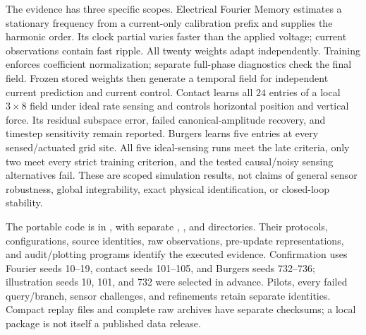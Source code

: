 \documentclass[journal]{IEEEtran}
\begin{document}
The evidence has three specific scopes. Electrical Fourier Memory estimates a
stationary frequency from a current-only calibration prefix and supplies the
harmonic order. Its clock partial varies faster than the applied voltage;
current observations contain fast ripple. All twenty weights adapt independently.
Training enforces coefficient normalization; separate full-phase diagnostics
check the final field. Frozen stored weights then generate a temporal field for
independent current prediction and current control. Contact learns all $24$ entries of a local
$3\times8$ field under ideal rate sensing and controls horizontal position
and vertical force. Its residual subspace error, failed canonical-amplitude
recovery, and timestep sensitivity remain reported. Burgers learns five
entries at every sensed/actuated grid site. All five ideal-sensing runs meet
the late criteria, only two meet every strict training criterion, and the
tested causal/noisy sensing alternatives fail. These are scoped simulation
results, not claims of general sensor robustness, global integrability,
exact physical identification, or closed-loop stability.

The portable code is in , with separate
, , and  directories. Their
protocols, configurations, source identities, raw observations, pre-update
representations, and audit/plotting programs identify the executed evidence.
Confirmation uses Fourier seeds 10--19, contact seeds 101--105, and Burgers
seeds 732--736; illustration seeds 10, 101, and 732 were selected in advance.
Pilots, every failed query/branch, sensor challenges, and refinements retain
separate identities. Compact replay files and complete raw archives have
separate checksums; a local package is not itself a published data release.


\clearpage

\end{document}
